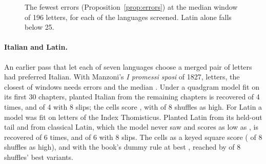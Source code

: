 \documentclass[11pt]{article}
\theoremstyle{definition}
\begin{document}
\begin{table}[t]
\centering
\caption{The twelve treebanks closest to the cells' letter counts, of \allLanguages{} screened. ``Fewest'' and ``Median'' are the fewest errors (Proposition~\ref{prop:errors}) at the closest and at the median window of 196 letters; ``Within 8 per million'' is the rate of windows needing 8 or fewer. Windows are taken every few letters, at most 250,000 a treebank.}
\label{tab:screen}
\small

\end{table}

\begin{figure}[t]
\centering

\caption{The fewest errors (Proposition~\ref{prop:errors}) at the median window of 196 letters, for each of the \allLanguages{} languages screened. Latin alone falls below 25.}
\label{fig:screen}
\end{figure}

\paragraph{Italian and Latin.} An earlier pass that let each of seven languages choose a merged pair of letters had preferred Italian. With Manzoni's \emph{I promessi sposi} of 1827, \itLetters{} letters, the closest of \itWindows{} windows needs \itFewest{} errors and the median \itMedian{}. Under a quadgram model fit on its first 30 chapters, planted Italian from the remaining chapters is recovered \itRecovered{} of 4 times, and \itErrRecovered{} of 4 with 8 slips; the cells score \itCells{}, with \itAsHigh{} of 8 shuffles as high. For Latin a model was fit on \laTrainLetters{} letters of the Index Thomisticus. Planted Latin from its held-out tail and from classical Latin, which the model never saw and scores as low as \laClassicalLow{}, is recovered \laRecovered{} of 6 times, and \laErrRecovered{} of 6 with 8 slips. The cells as a keyed square score \laSquare{} (\laSquareAsHigh{} of 8 shuffles as high), and with the book's dummy rule at best \laBest{}, reached by \laBestAsHigh{} of 8 shuffles' best variants.
\end{document}
